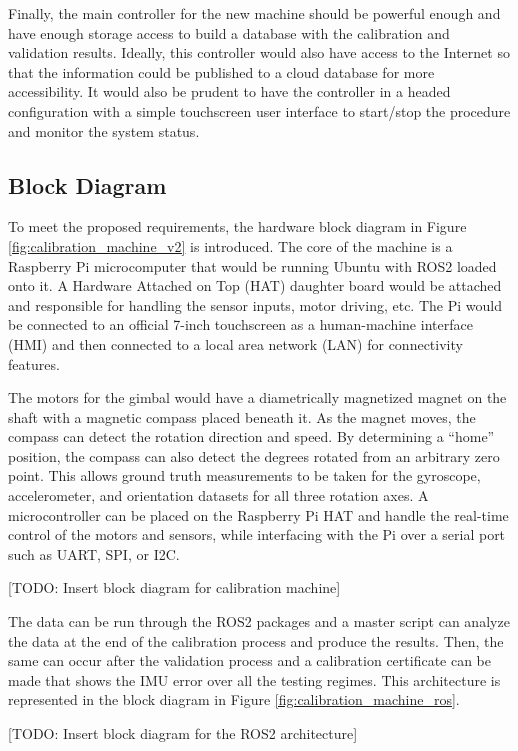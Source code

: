 Finally, the main controller for the new machine should be powerful enough and have enough storage access to build a database with the calibration and validation results.
Ideally, this controller would also have access to the Internet so that the information could be published to a cloud database for more accessibility.
It would also be prudent to have the controller in a headed configuration with a simple touchscreen user interface to start/stop the procedure and monitor the system status.

\subsection{Block Diagram} 
To meet the proposed requirements, the hardware block diagram in Figure \ref{fig:calibration_machine_v2} is introduced.
The core of the machine is a Raspberry Pi microcomputer that would be running Ubuntu with ROS2 loaded onto it.
A Hardware Attached on Top (HAT) daughter board would be attached and responsible for handling the sensor inputs, motor driving, etc.
The Pi would be connected to an official 7-inch touchscreen as a human-machine interface (HMI) and then connected to a local area network (LAN) for connectivity features.

The motors for the gimbal would have a diametrically magnetized magnet on the shaft with a magnetic compass placed beneath it.
As the magnet moves, the compass can detect the rotation direction and speed.
By determining a ``home'' position, the compass can also detect the degrees rotated from an arbitrary zero point.
This allows ground truth measurements to be taken for the gyroscope, accelerometer, and orientation datasets for all three rotation axes.
A microcontroller can be placed on the Raspberry Pi HAT and handle the real-time control of the motors and sensors, while interfacing with the Pi over a serial port such as UART, SPI, or I2C.

[TODO: Insert block diagram for calibration machine]

The data can be run through the ROS2 packages and a master script can analyze the data at the end of the calibration process and produce the results.
Then, the same can occur after the validation process and a calibration certificate can be made that shows the IMU error over all the testing regimes.
This architecture is represented in the block diagram in Figure \ref{fig:calibration_machine_ros}.

[TODO: Insert block diagram for the ROS2 architecture]

